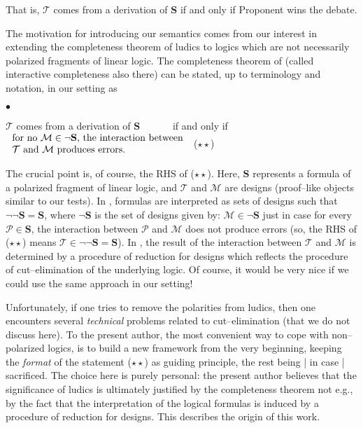 \documentclass[copyright,creativecommons]{eptcs}
\def\eg{e.g., }
\newcommand{\cM}{\mathcal{M}}
\newcommand{\cP}{\mathcal{P}}
\newcommand{\cT}{\mathcal{T}}
\newcommand{\bS}{\mathbf{S}}
\theoremstyle{definition}
\newcommand{\squishlist}{
 \begin{list}{$\bullet$}
  { \setlength{\itemsep}{0pt}
     \setlength{\parsep}{3pt}
     \setlength{\topsep}{3pt}
     \setlength{\partopsep}{0pt}
     \setlength{\leftmargin}{1em}
     \setlength{\labelwidth}{1.5em}
     \setlength{\labelsep}{0.5em} } }
\newcommand{\squishend}{
  \end{list}  }
\begin{document}
\noindent That is, $\cT$ comes from a derivation  of $\bS$ if and only if Proponent wins the debate.

The motivation for introducing our semantics comes
from our interest   in extending
the completeness theorem of ludics \cite{locus} to logics which
are not necessarily polarized fragments of linear logic.
 The completeness theorem of \cite{BT}
(called interactive completeness also there) can be stated, up to terminology and notation, in our setting as
\vspace{-0.1cm}
\squishlist
\item[] {\centering
$\cT$ comes from a derivation  of $\bS$ \ \ \ \ \ \ if and only if \ \ \ \ \ \ $\left.
  \begin{array}{l}
  \hbox{for  no $\cM \in \neg \bS$, the interaction between} \\
  \hbox{$\cT$ and $\cM$
produces errors.}   \end{array}
\right.$ \hfill ($\star\star$) \par}
\squishend
The crucial point is, of course,
the RHS of ($\star\star$).
Here, $\bS$ represents a formula of a polarized fragment of linear logic, and $\cT$ and $\cM$ are designs
(proof--like objects similar to our tests).
In \cite{BT}, formulas
are interpreted as sets of designs such that  $\neg \neg \bS = \bS$, where $ \neg \bS$ is the set
of designs given by:  $\cM \in \neg \bS$
just in case for every $\cP \in \bS$, the interaction between $\cP$  and $\cM$
does not produce errors (so, the RHS of ($\star\star$) means $\cT \in \neg \neg \bS = \bS$).
In \cite{BT},  the result of the interaction between $\cT$ and $\cM$   is determined by a procedure of reduction for designs which reflects the procedure of cut--elimination of the underlying logic.
Of course, it would be very nice if we could
use the same approach  in our setting!

Unfortunately, if one tries
to remove the polarities from  ludics, then one encounters
several \emph{technical} problems
related to cut--elimination (that we do not discuss here).
To the present author, the
most convenient way to cope with non--polarized logics, is to build
a new framework from the very beginning, keeping the \emph{format} of the statement ($\star\star$) as guiding principle, the rest being | in case |  sacrificed.
The  choice here is purely personal:
the present author believes that
the significance of ludics is ultimately justified by the  completeness theorem not \eg
by the fact that   the interpretation of the logical formulas is induced by a procedure of reduction for designs.
This describes the origin of this work.
\end{document}

